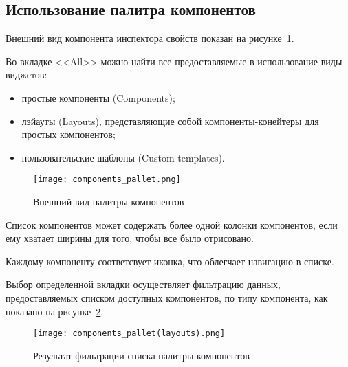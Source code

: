 \subsection{Использование палитра компонентов}
\label{sec:manual:pallet_manual}

Внешний вид компонента инспектора свойств показан на рисунке~\ref{sec:manual:components_pallet}.

Во вкладке <<All>> можно найти все предоставляемые в использование виды виджетов:
\begin{itemize}
  \item простые компоненты (Components);
  \item лэйауты (Layouts), представляющие собой компоненты-конейтеры для простых компонентов;
  \item пользовательские шаблоны (Custom templates).
\end{itemize}

\begin{figure}[ht]
  \centering
    \texttt{[image: components\_pallet.png]}
    \caption{Внешний вид палитры компонентов}
    \label{sec:manual:components_pallet}
\end{figure}

Список компонентов может содержать более одной колонки компонентов, если ему хватает ширины для того, чтобы все было отрисовано.

Каждому компоненту соответсвует иконка, что облегчает навигацию в списке.\pagebreak

Выбор определенной вкладки осуществляет фильтрацию данных, предоставляемых списком доступных компонентов, по типу компонента, как показано на рисунке~\ref{sec:manual:components_pallet_layouts}.

\begin{figure}[ht]
  \centering
    \texttt{[image: components\_pallet(layouts).png]}
    \caption{Результат фильтрации списка палитры компонентов}
    \label{sec:manual:components_pallet_layouts}
\end{figure}

